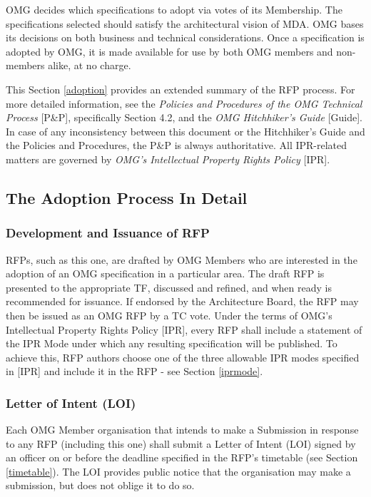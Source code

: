 OMG decides which specifications to adopt via votes of its Membership. The specifications selected should satisfy the architectural vision of MDA. OMG bases its decisions on both business and technical considerations. Once a specification is adopted by OMG, it is made available for use by both OMG members and non-members alike, at no charge.

This Section \ref{adoption} provides an extended summary of the RFP process. For more detailed information, see the \textit{Policies and Procedures of the OMG Technical Process} [P\&P], specifically Section 4.2, and the \textit{OMG Hitchhiker's Guide} [Guide]. In case of any inconsistency between this document or the Hitchhiker's Guide and the Policies and Procedures, the P\&P is always authoritative. All IPR-related matters are governed by \textit{OMG's Intellectual Property Rights Policy} [IPR].

\subsection{The Adoption Process In Detail}
\subsubsection{Development and Issuance of RFP}

RFPs, such as this one, are drafted by OMG Members who are interested in the adoption of an OMG specification in a particular area. The draft RFP is presented to the appropriate TF, discussed and refined, and when ready is recommended for issuance. If endorsed by the Architecture Board, the RFP may then be issued as an OMG RFP by a TC vote.
Under the terms of OMG's Intellectual Property Rights Policy [IPR], every RFP shall include a statement of the IPR Mode under which any resulting specification will be published. To achieve this, RFP authors choose one of the three allowable IPR modes specified in [IPR] and include it in the RFP - see Section \ref{iprmode}.


\subsubsection{Letter of Intent (LOI)}

Each OMG Member organisation that intends to make a Submission in response to any RFP (including this one) shall submit a Letter of Intent (LOI) signed by an officer on or before the deadline specified in the RFP's timetable (see Section \ref{timetable}). The LOI provides public notice that the organisation may make a submission, but does not oblige it to do so.


